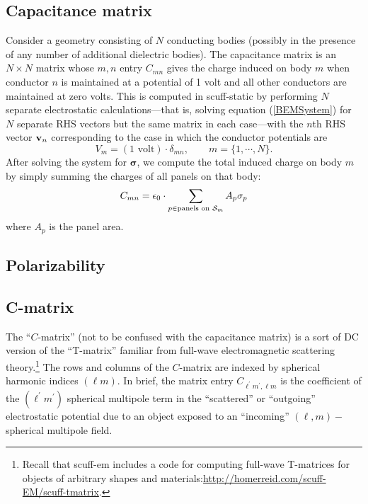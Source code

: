\documentclass[letterpaper]{article}
\newcommand{\vbsigma}{\boldsymbol{\sigma}}
\begin{document}
\subsection{Capacitance matrix}

Consider a geometry consisting of $N$ conducting bodies
(possibly in the presence of any number of additional
dielectric bodies). The capacitance matrix is an $N\times N$
matrix whose $m,n$ entry $C_{mn}$ gives the charge 
induced on body $m$ when conductor $n$ is maintained at 
a potential of 1 volt and all other conductors are maintained
at zero volts. This is computed in {\sc scuff-static}
by performing $N$ separate electrostatic calculations---that 
is, solving equation (\ref{BEMSystem}) for $N$ separate RHS 
vectors but the same matrix in each case---with the 
$n$th RHS vector $\mathbf{v}_n$ corresponding to the case 
in which the conductor potentials are 
$$V_m = (1\text{ volt})\cdot \delta_{mn}, \qquad 
  m=\{1,\cdots,N\}.$$
After solving the system for $\vbsigma$,
we compute the total induced charge on body $m$ by 
simply summing the charges of all panels on that body:
$$ C_{mn} 
   = 
   \epsilon_0 \cdot \sum_{p\in \text{panels on $\mathcal{S}_m$}} A_p \sigma_p 
$$
where $A_p$ is the panel area.

\subsection{Polarizability}

\subsection{C-matrix}

The ``$C$-matrix'' (not to be confused with the capacitance
matrix) is a sort of DC version of the ``T-matrix'' familiar
from full-wave electromagnetic scattering 
theory.\footnote{Recall that {\sc scuff-em} includes a code
for computing full-wave T-matrices for objects of arbitrary 
shapes and materials:\url{http://homerreid.com/scuff-EM/scuff-tmatrix}.}
The rows and columns of the $C$-matrix are indexed by 
spherical harmonic indices $(\ell m)$. In brief, the matrix entry 
$C_{\ell^\prime m^\prime, \ell m}$ is the coefficient
of the $(\ell^\prime m^\prime)$ spherical multipole term
in the ``scattered'' or ``outgoing'' electrostatic potential 
due to an object exposed to an ``incoming'' 
$(\ell, m)-$spherical multipole field.
\end{document}
